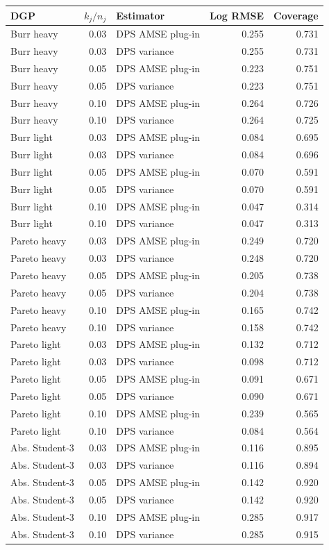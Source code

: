 \begin{tabular}{lrlrr}
\toprule
DGP & $k_j/n_j$ & Estimator & Log RMSE & Coverage \\
\midrule
Burr heavy & 0.03 & DPS AMSE plug-in & 0.255 & 0.731 \\
Burr heavy & 0.03 & DPS variance & 0.255 & 0.731 \\
Burr heavy & 0.05 & DPS AMSE plug-in & 0.223 & 0.751 \\
Burr heavy & 0.05 & DPS variance & 0.223 & 0.751 \\
Burr heavy & 0.10 & DPS AMSE plug-in & 0.264 & 0.726 \\
Burr heavy & 0.10 & DPS variance & 0.264 & 0.725 \\
Burr light & 0.03 & DPS AMSE plug-in & 0.084 & 0.695 \\
Burr light & 0.03 & DPS variance & 0.084 & 0.696 \\
Burr light & 0.05 & DPS AMSE plug-in & 0.070 & 0.591 \\
Burr light & 0.05 & DPS variance & 0.070 & 0.591 \\
Burr light & 0.10 & DPS AMSE plug-in & 0.047 & 0.314 \\
Burr light & 0.10 & DPS variance & 0.047 & 0.313 \\
Pareto heavy & 0.03 & DPS AMSE plug-in & 0.249 & 0.720 \\
Pareto heavy & 0.03 & DPS variance & 0.248 & 0.720 \\
Pareto heavy & 0.05 & DPS AMSE plug-in & 0.205 & 0.738 \\
Pareto heavy & 0.05 & DPS variance & 0.204 & 0.738 \\
Pareto heavy & 0.10 & DPS AMSE plug-in & 0.165 & 0.742 \\
Pareto heavy & 0.10 & DPS variance & 0.158 & 0.742 \\
Pareto light & 0.03 & DPS AMSE plug-in & 0.132 & 0.712 \\
Pareto light & 0.03 & DPS variance & 0.098 & 0.712 \\
Pareto light & 0.05 & DPS AMSE plug-in & 0.091 & 0.671 \\
Pareto light & 0.05 & DPS variance & 0.090 & 0.671 \\
Pareto light & 0.10 & DPS AMSE plug-in & 0.239 & 0.565 \\
Pareto light & 0.10 & DPS variance & 0.084 & 0.564 \\
Abs. Student-3 & 0.03 & DPS AMSE plug-in & 0.116 & 0.895 \\
Abs. Student-3 & 0.03 & DPS variance & 0.116 & 0.894 \\
Abs. Student-3 & 0.05 & DPS AMSE plug-in & 0.142 & 0.920 \\
Abs. Student-3 & 0.05 & DPS variance & 0.142 & 0.920 \\
Abs. Student-3 & 0.10 & DPS AMSE plug-in & 0.285 & 0.917 \\
Abs. Student-3 & 0.10 & DPS variance & 0.285 & 0.915 \\
\bottomrule
\end{tabular}
